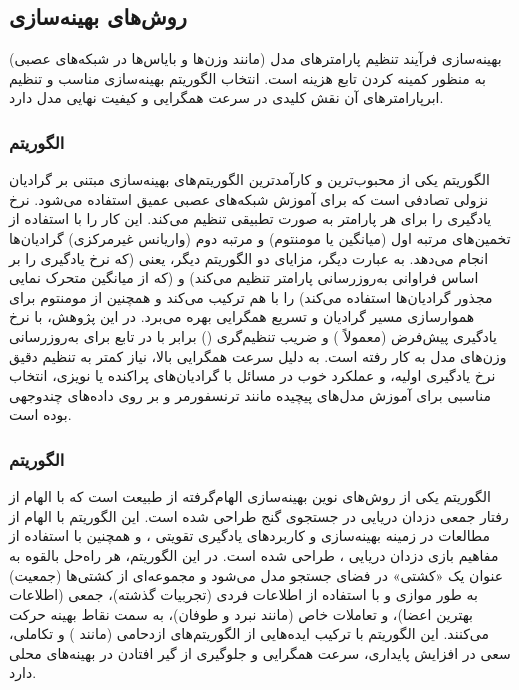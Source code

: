 \subsection{روش‌های بهینه‌سازی}
بهینه‌سازی فرآیند تنظیم پارامترهای مدل (مانند وزن‌ها و بایاس‌ها در شبکه‌های عصبی) به منظور کمینه کردن تابع هزینه  است. انتخاب الگوریتم بهینه‌سازی مناسب و تنظیم ابرپارامترهای  آن نقش کلیدی در سرعت همگرایی و کیفیت نهایی مدل دارد.

\subsubsection{الگوریتم }
الگوریتم   یکی از محبوب‌ترین و کارآمدترین الگوریتم‌های بهینه‌سازی مبتنی بر گرادیان نزولی تصادفی  است که برای آموزش شبکه‌های عصبی عمیق استفاده می‌شود.  نرخ یادگیری  را برای هر پارامتر به صورت تطبیقی تنظیم می‌کند. این کار را با استفاده از تخمین‌های مرتبه اول (میانگین یا مومنتوم) و مرتبه دوم (واریانس غیرمرکزی) گرادیان‌ها انجام می‌دهد. به عبارت دیگر،  مزایای دو الگوریتم دیگر، یعنی  (که نرخ یادگیری را بر اساس فراوانی به‌روزرسانی پارامتر تنظیم می‌کند) و  (که از میانگین متحرک نمایی مجذور گرادیان‌ها استفاده می‌کند) را با هم ترکیب می‌کند و همچنین از مومنتوم برای هموارسازی مسیر گرادیان و تسریع همگرایی بهره می‌برد.
در این پژوهش،  با نرخ یادگیری پیش‌فرض (معمولاً ) و ضریب تنظیم‌گری  () برابر با  در تابع  برای به‌روزرسانی وزن‌های مدل  به کار رفته است.  به دلیل سرعت همگرایی بالا، نیاز کمتر به تنظیم دقیق نرخ یادگیری اولیه، و عملکرد خوب در مسائل با گرادیان‌های پراکنده یا نویزی، انتخاب مناسبی برای آموزش مدل‌های پیچیده مانند ترنسفورمر و  بر روی داده‌های چندوجهی بوده است.

\subsubsection{الگوریتم }
الگوریتم  یکی از روش‌های نوین بهینه‌سازی الهام‌گرفته از طبیعت است که با الهام از رفتار جمعی دزدان دریایی در جستجوی گنج طراحی شده است. این الگوریتم با الهام از مطالعات \cite{Dunning2010} در زمینه بهینه‌سازی و کاربردهای یادگیری تقویتی \cite{LeQuy2023}، و همچنین با استفاده از مفاهیم بازی دزدان دریایی ، طراحی شده است. در این الگوریتم، هر راه‌حل بالقوه به عنوان یک «کشتی» در فضای جستجو مدل می‌شود و مجموعه‌ای از کشتی‌ها (جمعیت) به طور موازی و با استفاده از اطلاعات فردی (تجربیات گذشته)، جمعی (اطلاعات بهترین اعضا)، و تعاملات خاص (مانند نبرد و طوفان)، به سمت نقاط بهینه حرکت می‌کنند. این الگوریتم با ترکیب ایده‌هایی از الگوریتم‌های ازدحامی (مانند ) و تکاملی، سعی در افزایش پایداری، سرعت همگرایی و جلوگیری از گیر افتادن در بهینه‌های محلی دارد.

